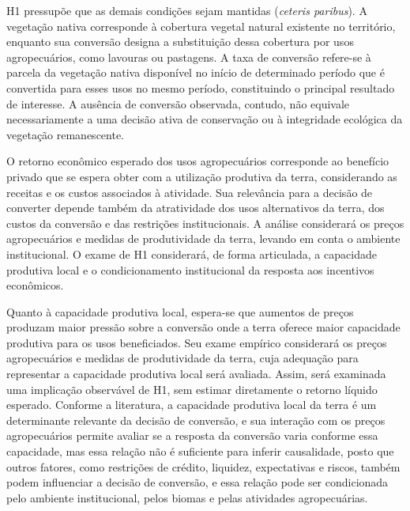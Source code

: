 
H1 pressupõe que as demais condições sejam mantidas (\textit{ceteris paribus}). A vegetação nativa corresponde à cobertura vegetal natural existente no território, enquanto sua conversão designa a substituição dessa cobertura por usos agropecuários, como lavouras ou pastagens. A taxa de conversão refere-se à parcela da vegetação nativa disponível no início de determinado período que é convertida para esses usos no mesmo período, constituindo o principal resultado de interesse. A ausência de conversão observada, contudo, não equivale necessariamente a uma decisão ativa de conservação ou à integridade ecológica da vegetação remanescente. 

O retorno econômico esperado dos usos agropecuários corresponde ao benefício privado que se espera obter com a utilização produtiva da terra, considerando as receitas e os custos associados à atividade. Sua relevância para a decisão de converter depende também da atratividade dos usos alternativos da terra, dos custos da conversão e das restrições institucionais. A análise considerará os preços agropecuários e medidas de produtividade da terra, levando em conta o ambiente institucional. O exame de H1 considerará, de forma articulada, a capacidade produtiva local e o condicionamento institucional da resposta aos incentivos econômicos.

Quanto à capacidade produtiva local, espera-se que aumentos de preços produzam maior pressão sobre a conversão onde a terra oferece maior capacidade produtiva para os usos beneficiados. Seu exame empírico considerará os preços agropecuários e medidas de produtividade da terra, cuja adequação para representar a capacidade produtiva local será avaliada. Assim, será examinada uma implicação observável de H1, sem estimar diretamente o retorno líquido esperado. Conforme a literatura, a capacidade produtiva local da terra é um determinante relevante da decisão de conversão, e sua interação com os preços agropecuários permite avaliar se a resposta da conversão varia conforme essa capacidade, mas essa relação não é suficiente para inferir causalidade, posto que outros fatores, como restrições de crédito, liquidez, expectativas e riscos, também podem influenciar a decisão de conversão, e essa relação pode ser condicionada pelo ambiente institucional, pelos biomas e pelas atividades agropecuárias.

